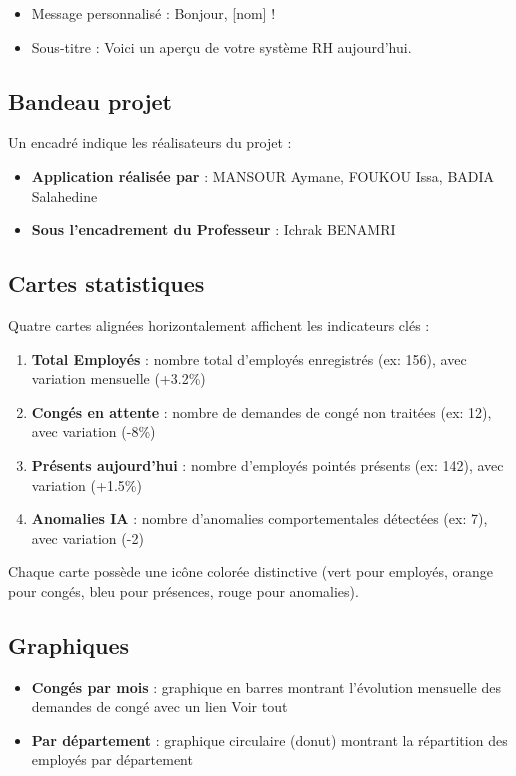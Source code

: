 \documentclass[12pt,a4paper]{report}
\begin{document}
\begin{itemize}
    \item Message personnalisé : \og Bonjour, [nom] ! \fg{}
    \item Sous-titre : \og Voici un aperçu de votre système RH aujourd'hui. \fg{}
\end{itemize}

\subsection{Bandeau projet}

Un encadré indique les réalisateurs du projet :
\begin{itemize}
    \item \textbf{Application réalisée par} : MANSOUR Aymane, FOUKOU Issa, BADIA Salahedine
    \item \textbf{Sous l'encadrement du Professeur} : Ichrak BENAMRI
\end{itemize}

\subsection{Cartes statistiques}

Quatre cartes alignées horizontalement affichent les indicateurs clés :
\begin{enumerate}
    \item \textbf{Total Employés} : nombre total d'employés enregistrés (ex: 156), avec variation mensuelle (+3.2\%)
    \item \textbf{Congés en attente} : nombre de demandes de congé non traitées (ex: 12), avec variation (-8\%)
    \item \textbf{Présents aujourd'hui} : nombre d'employés pointés présents (ex: 142), avec variation (+1.5\%)
    \item \textbf{Anomalies IA} : nombre d'anomalies comportementales détectées (ex: 7), avec variation (-2)
\end{enumerate}

Chaque carte possède une icône colorée distinctive (vert pour employés, orange pour congés, bleu pour présences, rouge pour anomalies).

\subsection{Graphiques}

\begin{itemize}
    \item \textbf{Congés par mois} : graphique en barres montrant l'évolution mensuelle des demandes de congé avec un lien \og Voir tout \fg{}
    \item \textbf{Par département} : graphique circulaire (donut) montrant la répartition des employés par département
\end{itemize}
\end{document}
